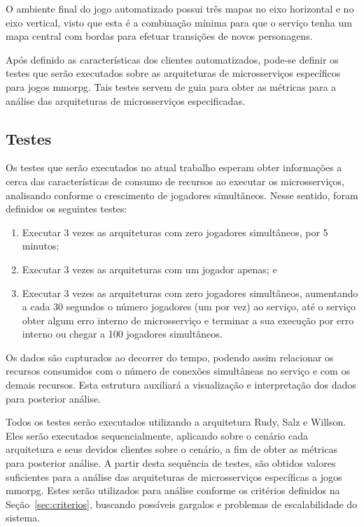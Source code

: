O ambiente final do jogo automatizado possui três mapas no eixo horizontal e no eixo vertical, visto que esta é a combinação mínima para que o serviço tenha um mapa central com bordas para efetuar transições de novos personagens.

Após definido as características dos clientes automatizados, pode-se definir os testes que serão executados sobre as arquiteturas de microsserviços específicos para jogos \ac{mmorpg}.
%
Tais testes servem de guia para obter as métricas para a análise das arquiteturas de microsserviços especificadas.

\subsection{Testes}
\label{sec:cap4_testes}

Os testes que serão executados no atual trabalho esperam obter informações a cerca das características de consumo de recursos ao  executar os microsserviços, analisando conforme o crescimento de jogadores simultâneos.
%
Nesse sentido, foram definidos os seguintes testes:

\begin{enumerate}
  \item Executar 3 vezes as arquiteturas com zero jogadores simultâneos, por 5 minutos;
  \item Executar 3 vezes as arquiteturas com um jogador apenas; e
  \item Executar 3 vezes as arquiteturas com zero jogadores simultâneos, aumentando a cada 30 segundos o número jogadores (um por vez) ao serviço, até o serviço obter algum erro interno de microsserviço e terminar a sua execução por erro interno ou chegar a 100 jogadores simultâneos.
\end{enumerate}

Os dados são capturados ao decorrer do tempo, podendo assim relacionar os recursos consumidos com o número de conexões simultâneas no serviço e com os demais recursos.
%
Esta estrutura auxiliará a visualização e interpretação dos dados para posterior análise.

Todos os testes serão executados utilizando a arquitetura Rudy, Salz e Willson.
%
Eles serão executados sequencialmente, aplicando sobre o cenário cada arquitetura e seus devidos clientes sobre o cenário, a fim de obter as métricas para posterior análise.
%
A partir desta sequência de testes, são obtidos valores suficientes para a análise das arquiteturas de microsserviços específicas a jogos \ac{mmorpg}.
%
Estes serão utilizados para análise conforme os critérios definidos na Seção~\ref{sec:criterios}, buscando possíveis gargalos e problemas de escalabilidade do sistema.


